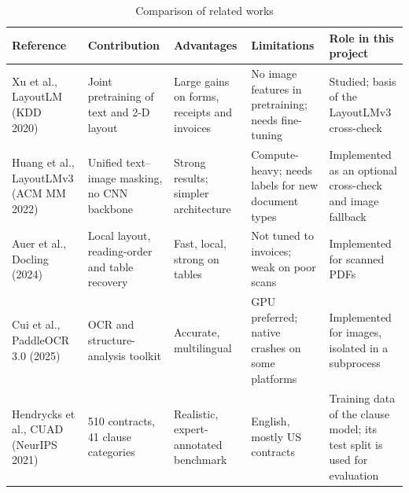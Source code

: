 \begin{table}[H]
\centering\tablestyle
\caption{Comparison of related works}\label{tab:related}
\begin{tabularx}{\textwidth}{|L{0.16\textwidth}|L{0.18\textwidth}|L{0.16\textwidth}|L{0.17\textwidth}|Y|}
\hline
\textbf{Reference} & \textbf{Contribution} & \textbf{Advantages} & \textbf{Limitations} & \textbf{Role in this project} \\ \hline
Xu et al., LayoutLM (KDD 2020)~\cite{xu2020layoutlm} & Joint pretraining of text and 2-D layout & Large gains on forms, receipts and invoices & No image features in pretraining; needs fine-tuning & Studied; basis of the LayoutLMv3 cross-check \\ \hline
Huang et al., LayoutLMv3 (ACM MM 2022)~\cite{huang2022layoutlmv3} & Unified text--image masking, no CNN backbone & Strong results; simpler architecture & Compute-heavy; needs labels for new document types & Implemented as an optional cross-check and image fallback \\ \hline
Auer et al., Docling (2024)~\cite{auer2024docling} & Local layout, reading-order and table recovery & Fast, local, strong on tables & Not tuned to invoices; weak on poor scans & Implemented for scanned PDFs \\ \hline
Cui et al., PaddleOCR 3.0 (2025)~\cite{cui2025paddleocr} & OCR and structure-analysis toolkit & Accurate, multilingual & GPU preferred; native crashes on some platforms & Implemented for images, isolated in a subprocess \\ \hline
Hendrycks et al., CUAD (NeurIPS 2021)~\cite{hendrycks2021cuad} & 510 contracts, 41 clause categories & Realistic, expert-annotated benchmark & English, mostly US contracts & Training data of the clause model; its test split is used for evaluation \\ \hline
\end{tabularx}
\end{table}

